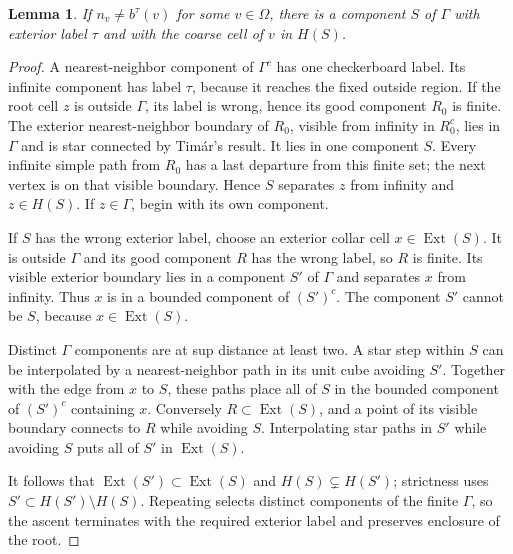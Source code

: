 \documentclass[11pt,a4paper]{article}
\DeclareMathOperator{\Ext}{Ext}
\newtheorem{lemma}[theorem]{Lemma}
\numberwithin{equation}{section}
\begin{document}
\begin{lemma}\label{lem:outer-selection}
If $n_v\ne b^\tau(v)$ for some $v\in\Omega$, there is a component $S$
of $\Gamma$ with exterior label $\tau$ and with the coarse cell of $v$
in $H(S)$.
\end{lemma}
\begin{proof}
A nearest-neighbor component of $\Gamma^c$ has one checkerboard label.
Its infinite component has label $\tau$, because it reaches the fixed
outside region.
If the root cell $z$ is outside $\Gamma$, its label is wrong, hence
its good component $R_0$ is finite. The exterior nearest-neighbor
boundary of $R_0$, visible from infinity in $R_0^c$, lies in $\Gamma$
and is star connected by Tim\'ar's result. It lies in one component $S$.
Every infinite simple path from $R_0$ has a last departure from this
finite set; the next vertex is on that visible boundary. Hence $S$
separates $z$ from infinity and $z\in H(S)$.
If $z\in\Gamma$, begin with its own component.

If $S$ has the wrong exterior label, choose an exterior collar cell
$x\in\Ext(S)$. It is outside $\Gamma$ and its good component $R$ has
the wrong label, so $R$ is finite. Its visible exterior boundary lies
in a component $S'$ of $\Gamma$ and separates $x$ from infinity.
Thus $x$ is in a bounded component of $(S')^c$. The component $S'$ cannot
be $S$, because $x\in\Ext(S)$.

Distinct $\Gamma$ components are at sup distance at least two.
A star step within $S$ can be interpolated by a nearest-neighbor path
in its unit cube avoiding $S'$. Together with the edge from $x$ to $S$,
these paths place all of $S$ in the bounded component of $(S')^c$
containing $x$. Conversely $R\subset\Ext(S)$, and a point of its visible
boundary connects to $R$ while avoiding $S$. Interpolating star paths
in $S'$ while avoiding $S$ puts all of $S'$ in $\Ext(S)$.

It follows that $\Ext(S')\subset\Ext(S)$ and
$H(S)\subsetneq H(S')$; strictness uses
$S'\subset H(S')\setminus H(S)$.
Repeating selects distinct components of the finite $\Gamma$, so the
ascent terminates with the required exterior label and preserves enclosure
of the root.
\end{proof}
\end{document}
